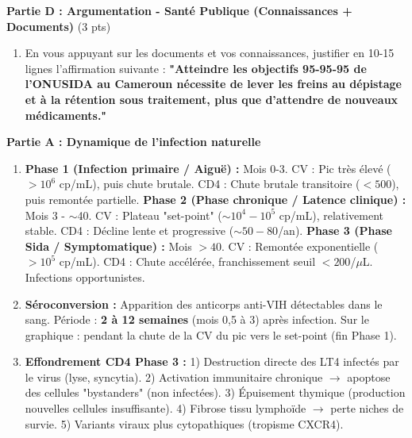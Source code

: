 \documentclass[11pt]{article}
\begin{document}
\begin{exercice}
\textbf{Partie D : Argumentation - Santé Publique (Connaissances + Documents)} \hfill (3 pts)
\begin{enumerate}
\item En vous appuyant sur les documents et vos connaissances, justifier en 10-15 lignes l'affirmation suivante : \textbf{"Atteindre les objectifs 95-95-95 de l'ONUSIDA au Cameroun nécessite de lever les freins au dépistage et à la rétention sous traitement, plus que d'attendre de nouveaux médicaments."}
\end{enumerate}
\end{exercice}

\begin{corrige}
\textbf{Partie A : Dynamique de l'infection naturelle}
\begin{enumerate}
\item \textbf{Phase 1 (Infection primaire / Aiguë) :} Mois 0-3. CV : Pic très élevé ($> 10^6$ cp/mL), puis chute brutale. CD4 : Chute brutale transitoire ($< 500$), puis remontée partielle.
\textbf{Phase 2 (Phase chronique / Latence clinique) :} Mois 3 - $\sim$40. CV : Plateau "set-point" ($\sim 10^4 - 10^5$ cp/mL), relativement stable. CD4 : Décline lente et progressive ($\sim 50-80$/an).
\textbf{Phase 3 (Phase Sida / Symptomatique) :} Mois $> 40$. CV : Remontée exponentielle ($> 10^5$ cp/mL). CD4 : Chute accélérée, franchissement seuil $< 200$/$\mu$L. Infections opportunistes.
\item \textbf{Séroconversion :} Apparition des anticorps anti-VIH détectables dans le sang. Période : \textbf{2 à 12 semaines} (mois 0,5 à 3) après infection. Sur le graphique : pendant la chute de la CV du pic vers le set-point (fin Phase 1).
\item \textbf{Effondrement CD4 Phase 3 :} 1) Destruction directe des LT4 infectés par le virus (lyse, syncytia). 2) Activation immunitaire chronique $\to$ apoptose des cellules "bystanders" (non infectées). 3) Épuisement thymique (production nouvelles cellules insuffisante). 4) Fibrose tissu lymphoïde $\to$ perte niches de survie. 5) Variants viraux plus cytopathiques (tropisme CXCR4).
\end{enumerate}


\end{corrige}
\end{document}
